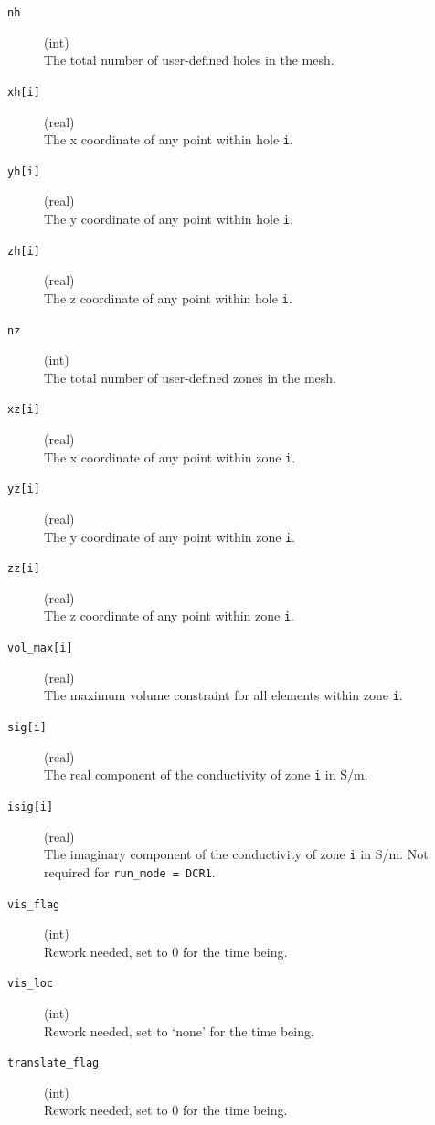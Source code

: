 \documentclass[a4paper,12pt]{article}
\begin{document}
\begin{description}
    \item[\texttt{nh}] (int)\hfill \\
    The total number of user-defined holes in the mesh.

    \item[\texttt{xh[i]}] (real)\hfill \\
    The x coordinate of any point within hole \texttt{i}.

    \item[\texttt{yh[i]}] (real)\hfill \\
    The y coordinate of any point within hole \texttt{i}.

    \item[\texttt{zh[i]}] (real)\hfill \\
    The z coordinate of any point within hole \texttt{i}.

    \item[\texttt{nz}] (int)\hfill \\
    The total number of user-defined zones in the mesh.

    \item[\texttt{xz[i]}] (real)\hfill \\
    The x coordinate of any point within zone \texttt{i}.

    \item[\texttt{yz[i]}] (real)\hfill \\
    The y coordinate of any point within zone \texttt{i}.

    \item[\texttt{zz[i]}] (real)\hfill \\
    The z coordinate of any point within zone \texttt{i}.

    \item[\texttt{vol\_max[i]}] (real)\hfill \\
    The maximum volume constraint for all elements within zone \texttt{i}.

    \item[\texttt{sig[i]}] (real)\hfill \\
    The real component of the conductivity of zone \texttt{i} in S/m.

    \item[\texttt{isig[i]}] (real)\hfill \\
    The imaginary component of the conductivity of zone \texttt{i} in S/m. Not required for \texttt{run\_mode = DCR1}.

    \item[\texttt{vis\_flag}] (int)\hfill \\
    Rework needed, set to 0 for the time being.

    \item[\texttt{vis\_loc}] (int)\hfill \\
    Rework needed, set to `none' for the time being.

    \item[\texttt{translate\_flag}] (int)\hfill \\
    Rework needed, set to 0 for the time being.
\end{description}
\end{document}
